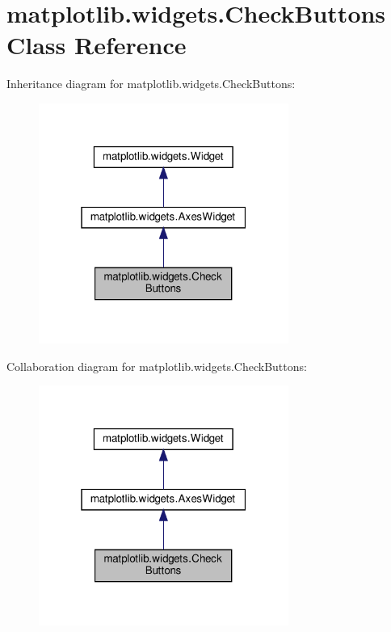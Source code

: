 \hypertarget{classmatplotlib_1_1widgets_1_1CheckButtons}{}\section{matplotlib.\+widgets.\+Check\+Buttons Class Reference}
\label{classmatplotlib_1_1widgets_1_1CheckButtons}


Inheritance diagram for matplotlib.\+widgets.\+Check\+Buttons\+:
\nopagebreak
\begin{figure}[H]
\begin{center}
\leavevmode
\includegraphics[width=232pt]{classmatplotlib_1_1widgets_1_1CheckButtons__inherit__graph}
\end{center}
\end{figure}


Collaboration diagram for matplotlib.\+widgets.\+Check\+Buttons\+:
\nopagebreak
\begin{figure}[H]
\begin{center}
\leavevmode
\includegraphics[width=232pt]{classmatplotlib_1_1widgets_1_1CheckButtons__coll__graph}
\end{center}
\end{figure}
